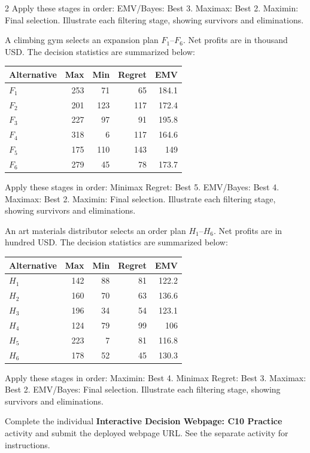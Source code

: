 \begin{multicols}{2}
\noindent Apply these stages in order: EMV/Bayes: Best 3. Maximax: Best 2. Maximin: Final selection.
Illustrate each filtering stage, showing survivors and eliminations.

A climbing gym selects an expansion plan $F_1$--$F_6$. Net profits are in thousand USD. The decision statistics are summarized below:
\vspace{-4mm}
\begin{center}\small\setlength{\tabcolsep}{4pt}
	\begin{tabular}{lrrrr}\toprule
		Alternative & Max & Min & Regret & EMV\\ \midrule
		$F_1$ & 253 & 71 & 65 & 184.1\\
		$F_2$ & 201 & 123 & 117 & 172.4\\
		$F_3$ & 227 & 97 & 91 & 195.8\\
		$F_4$ & 318 & 6 & 117 & 164.6\\
		$F_5$ & 175 & 110 & 143 & 149\\
		$F_6$ & 279 & 45 & 78 & 173.7\\
		\bottomrule
	\end{tabular}
\end{center}
\vspace{-3mm}
\noindent Apply these stages in order: Minimax Regret: Best 5. EMV/Bayes: Best 4. Maximax: Best 2. Maximin: Final selection.
Illustrate each filtering stage, showing survivors and eliminations.

An art materials distributor selects an order plan $H_1$--$H_6$. Net profits are in hundred USD. The decision statistics are summarized below:
\vspace{-3mm}
\begin{center}\small\setlength{\tabcolsep}{4pt}
	\begin{tabular}{lrrrr}\toprule
		Alternative & Max & Min & Regret & EMV\\ \midrule
		$H_1$ & 142 & 88 & 81 & 122.2\\
		$H_2$ & 160 & 70 & 63 & 136.6\\
		$H_3$ & 196 & 34 & 54 & 123.1\\
		$H_4$ & 124 & 79 & 99 & 106\\
		$H_5$ & 223 & 7 & 81 & 116.8\\
		$H_6$ & 178 & 52 & 45 & 130.3\\
		\bottomrule
	\end{tabular}
\end{center}
\vspace{-3mm}
\noindent Apply these stages in order: Maximin: Best 4. Minimax Regret: Best 3. Maximax: Best 2. EMV/Bayes: Final selection.
Illustrate each filtering stage, showing survivors and eliminations.

\par
{}
		Complete the individual \textbf{Interactive Decision Webpage: C10 Practice} activity and submit the deployed webpage URL. See the separate activity for instructions.
		
	\end{multicols}

